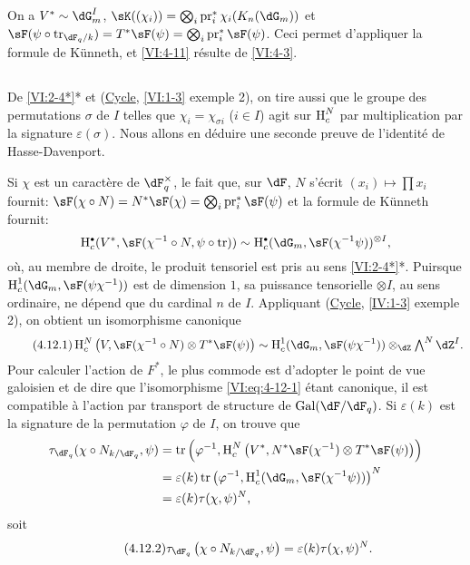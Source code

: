 On a $V^\ast\sim \dG_m^I$, 
$\sK((\chi_i)) = \bigotimes_i \operatorname{pr}_i^\ast \chi_i(K_n(\dG_m))$ et 
$\sF(\psi\circ \tr_{\dF_q/k})=T^\ast \sF(\psi) = \bigotimes_i \operatorname{pr}_i^\ast \sF(\psi)$. 
Ceci permet d'appliquer la formule de K\"unneth, et \ref{VI:4-11} r\'esulte de 
\ref{VI:4-3}. 





\subsection{}\label{VI:4-12}

De \ref{VI:2-4*}* et (\hyperlink{VI}{Cycle}, \ref{VI:1-3} exemple 2), on tire 
aussi que le groupe des permutations $\sigma$ de $I$ telles que 
$\chi_i = \chi_{\sigma i}$ ($i\in I$) agit sur $\operatorname{H}_c^N$ par multiplication par 
la signature $\varepsilon(\sigma)$. Nous allons en d\'eduire une seconde preuve 
de l'identit\'e de Hasse-Davenport. 

Si $\chi$ est un caract\`ere de $\dF_q^\times$, le fait que, sur $\dF$, $N$ 
s'\'ecrit $(x_i)\mapsto \prod x_i$ fournit: 
$\sF(\chi\circ N)=N^\ast\sF(\chi) = \bigotimes_i \operatorname{pr}_i^\ast\sF(\psi)$ 
et la formule de K\"unneth fournit: 
\[
  \h_c^\bullet(V^\ast,\sF(\chi^{-1}\circ N,\psi\circ \tr)) \sim \h_c^\bullet(\dG_m,\sF(\chi^{-1}\psi))^{\otimes I} \text{,} 
\]
o\`u, au membre de droite, le produit tensoriel est pris au sens 
\ref{VI:2-4*}*. Puirsque $\h_c^1(\dG_m,\sF(\psi\chi^{-1}))$ est de dimension 
$1$, sa puissance tensorielle $\otimes I$, au sens ordinaire, ne d\'epend que 
du cardinal $n$ de $I$. Appliquant (\hyperlink{IV}{Cycle}, \ref{IV:1-3} exemple 
2), on obtient un isomorphisme canonique 
\begin{equation*}\tag{4.12.1}\label{VI:eq:4-12-1}
  \h_c^N\left(V,\sF(\chi^{-1}\circ N)\otimes T^\ast \sF(\psi)\right) \sim \h_c^1(\dG_m,\sF(\psi\chi^{-1})) \otimes_\dZ \textstyle \bigwedge^N \dZ^I \text{.}
\end{equation*}
Pour calculer l'action de $F^\ast$, le plus commode est d'adopter le point de 
vue galoisien et de dire que l'isomorphisme \eqref{VI:eq:4-12-1} \'etant 
canonique, il est compatible \`a l'action par transport de structure de 
$\gal(\dF/\dF_q)$. Si $\varepsilon(k)$ est la signature de la permutation 
$\varphi$ de $I$, on trouve que 
\begin{align*} 
  \tau_{\dF_q}(\chi\circ N_{k/\dF_q},\psi) 
    &= \tr\left(\varphi^{-1},\h_c^N\left(V^\ast,N^\ast\sF(\chi^{-1})\otimes T^\ast \sF(\psi)\right)\right) \\ 
    &= \varepsilon(k) \tr\left(\varphi^{-1},\h_c^1(\dG_m,\sF(\chi^{-1}\psi))\right)^N \\
    &= \varepsilon(k) \tau(\chi,\psi)^N \text{,} 
\end{align*}
soit 
\begin{equation*}\tag{4.12.2}\label{VI:eq:4-12-2}
  \tau_{\dF_q}\left(\chi\circ N_{k/\dF_q},\psi\right) = \varepsilon(k) \tau(\chi,\psi)^N \text{.} 
\end{equation*}

